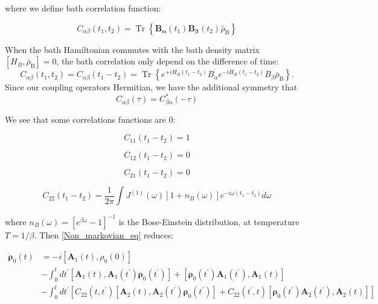 \documentclass[%
preprint,
onecolumn,
notitlepag,
 amsmath,amssymb,
 aps,
 pra,
]{revtex4-2}
\begin{document}
where we  define bath correlation function: 

\begin{equation}
C_{\alpha \beta}\left(t_{1}, t_{2}\right)=\operatorname{Tr}\left\{\boldsymbol{B}_{\boldsymbol{\alpha}}\left(t_{1}\right) \boldsymbol{B}_{\boldsymbol{\beta}}\left(t_{2}\right) \bar{\rho}_{\mathrm{B}}\right\}
\end{equation}

 When the bath Hamiltonian commutes with the bath density matrix $\left[H_{B}, \bar{\rho}_{\mathrm{B}}\right]=0$, the bath correlation only depend on the difference of time:
$$
C_{\alpha \beta}\left(t_{1}, t_{2}\right)=C_{\alpha \beta}\left(t_{1}-t_{2}\right)=\operatorname{Tr}\left\{e^{+i H_{B}\left(t_{1}-t_{2}\right)} B_{\alpha} e^{-i H_{B}\left(t_{1}-t_{2}\right)} B_{\beta} \bar{\rho}_{\mathrm{B}}\right\} .
$$
Since our coupling operators Hermitian, we have the additional symmetry that
$$
C_{\alpha \beta}(\tau)=C_{\beta \alpha}^{*}(-\tau)
$$

We see that some correlations functions are 0: 

\begin{equation}
    C_{11}(t_1-t_2)=1
\end{equation}

\begin{equation}
    C_{12}(t_1-t_2)=0
\end{equation}

\begin{equation}
    C_{21}(t_1-t_2)=0
\end{equation}

\begin{equation}
    C_{22}(t_1-t_2)=\frac{1}{2 \pi} \int J^{(1)}(\omega) \left[1+ n_B(\omega) \right] e ^{- i \omega (t_1- t_2)} d\omega
\end{equation}

where $n_B(\omega) = \left[e^{\beta \omega}-1\right]^{-1} $ is the Bose-Einstein distribution, at temperature $T= 1/\beta$. Then \eqref{Non_markovian_eq} reduces:

\begin{equation}
\begin{aligned}
\dot{\boldsymbol{\rho}}_0(t) &=  -i \left[ \boldsymbol{A}_1(t) , \rho_0(0) \right] \\
&- \int_{0}^{t} d t^{\prime}\left[\boldsymbol{A}_1(t), \boldsymbol{A}_1\left(t^{\prime}\right) \boldsymbol{\rho}_0\left(t^{\prime}\right)\right] + \left[\boldsymbol{\rho}_0\left(t^{\prime}\right) \boldsymbol{A}_1 \left(t^{\prime}\right), \boldsymbol{A}_1(t)\right]  \\
& - \int_{0}^{t} d t^{\prime}\left[C_{22}\left(t, t^{\prime}\right)\left[\boldsymbol{A}_2(t), \boldsymbol{A}_2\left(t^{\prime}\right) \boldsymbol{\rho}_0 \left(t^{\prime}\right)\right] +C_{22}\left(t^{\prime}, t\right)\left[\boldsymbol{\rho}_0 \left(t^{\prime}\right) \boldsymbol{A}_2 \left(t^{\prime}\right), \boldsymbol{A}_2 (t)\right]\right] 
\end{aligned}
\label{Non_markovian_eq}
\end{equation}
\end{document}
